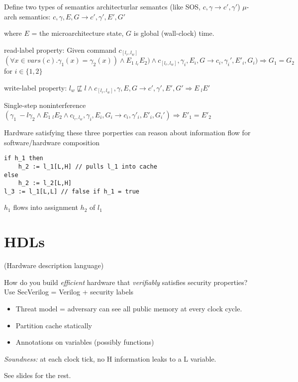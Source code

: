 \documentclass{article}
\begin{document}
Define two types of semantics
architecturlar semantcs (like SOS, $c,\gamma \longrightarrow c',\gamma'$)
$\mu$-arch semantics: $c,\gamma,E,G \longrightarrow c',\gamma',E',G'$

where $E$ =  the microarchitecture state, $G$ is global (wall-clock) time.
 
read-label property: Given command $c_[l_r,l_w]$
$(\forall x \in vars(c) . \gamma_1(x) = \gamma_2(x)) \land E_1 ~_{l_r} E_2) \land c_[l_r,l_w],\gamma_i,E_i,G \longrightarrow c_i,\gamma_i',E'_i,G_i)  \Rightarrow G_1 = G_2$ for $i \in 
\{1,2\}$

write-label property: $l_w \not\sqsubseteq l \land c_{[l_r,l_w]}, \gamma,E,G \longrightarrow c', \gamma',E',G' \Rightarrow E ~_l E' $

Single-step noninterference
$(\gamma_1 ~-l \gamma_2 \land E_1 ~_l E_2 \land c_{l_r,l_w},\gamma_i,E_i,G_i \longrightarrow c_i,\gamma'_i,E'_i,G_i') \Rightarrow E'_1 = E'_2$

Hardware satisfying these three porperties can reason about information flow for software/hardware composition

\begin{lstlisting}[mathescape]
if h_1 then
    h_2 := l_1[L,H] // pulls l_1 into cache
else 
    h_2 := l_2[L,H]
l_3 := l_1[L,L] // false if h_1 = true
\end{lstlisting}
$h_1$ flows into assignment $h_2$ of $l_1$

\section{HDLs}
(Hardware description language)

How do you build \emph{efficient} hardware that \emph{verifiably} satisfies security properties?
Use SecVerilog = Verilog + security labels

\begin{itemize}
\item Threat model = adversary can see all public memory at every clock cycle.

\item Partition cache statically

\item Annotations on variables (possibly functions)
  
\end{itemize}

\emph{Soundness:} at each clock tick, no H information leaks to a L variable.
  
See slides for the rest.
\end{document}
